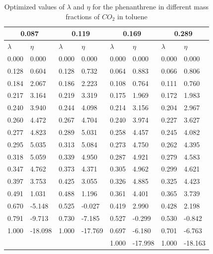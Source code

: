 \documentclass[
	12pt,				%
	openany,			%
	oneside,			%
	a4paper,			%
	english,			%
	brazil				%
	]{abntex2}
\begin{document}
\begin{apendicesenv}
\begin{table}[h]
	\centering
	\caption{Optimized values of $\lambda$ and $\eta$ for the phenanthrene in different mass fractions of $CO_{2}$ in toluene }
	\begin{tabular}{llllllll}
		\hline
		\multicolumn{2}{c}{0.087}& \multicolumn{2}{c}{0.119}& \multicolumn{2}{c}{0.169}& \multicolumn{2}{c}{0.289}\\
		\hline
		$\lambda$ & $\eta$ & $\lambda$ & $\eta$  & $\lambda$ & $\eta$  & $\lambda$ & $\eta$ \\ 
		\hline
0.000	&	0.000	&	0.000	&	0.000	&	0.000	&	0.000	&	0.000	&	0.000	\\
0.128	&	0.604	&	0.128	&	0.732	&	0.064	&	0.883	&	0.066	&	0.806	\\
0.184	&	2.067	&	0.186	&	2.223	&	0.108	&	0.764	&	0.111	&	0.760	\\
0.217	&	3.164	&	0.219	&	3.319	&	0.175	&	1.969	&	0.172	&	1.983	\\
0.240	&	3.940	&	0.244	&	4.098	&	0.214	&	3.156	&	0.204	&	2.967	\\
0.260	&	4.472	&	0.267	&	4.704	&	0.240	&	3.974	&	0.227	&	3.627	\\
0.277	&	4.823	&	0.289	&	5.031	&	0.258	&	4.457	&	0.245	&	4.082	\\
0.295	&	5.035	&	0.313	&	5.084	&	0.273	&	4.750	&	0.262	&	4.395	\\
0.318	&	5.059	&	0.339	&	4.950	&	0.287	&	4.921	&	0.279	&	4.583	\\
0.347	&	4.762	&	0.373	&	4.371	&	0.305	&	4.962	&	0.299	&	4.621	\\
0.397	&	3.753	&	0.425	&	3.055	&	0.326	&	4.885	&	0.325	&	4.423	\\
0.491	&	1.031	&	0.488	&	1.196	&	0.361	&	4.401	&	0.365	&	3.739	\\
0.670	&	-5.148	&	0.525	&	-0.027	&	0.419	&	2.990	&	0.428	&	2.198	\\
0.791	&	-9.713	&	0.730	&	-7.185	&	0.527	&	-0.299	&	0.530	&	-0.842	\\
1.000	&	-18.098	&	1.000	&	-17.769	&	0.697	&	-6.180	&	0.701	&	-6.763	\\
&		&		&		&	1.000	&	-17.998	&	1.000	&	-18.163	\\
		\hline
	\end{tabular}
\end{table}


\end{apendicesenv}
\end{document}
